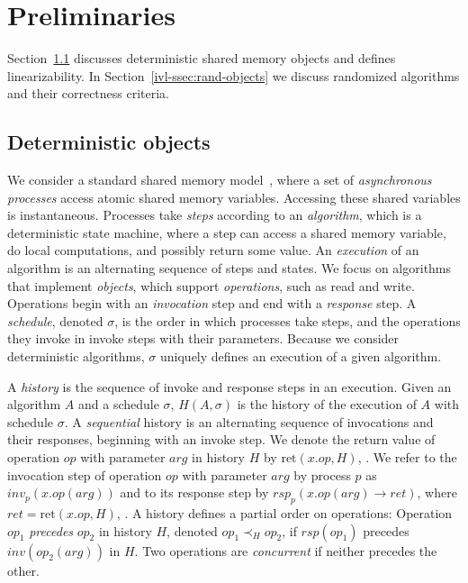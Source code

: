 \section{Preliminaries}
\label{ivl-sec:preliminaries}

Section~\ref{ivl-ssec:det-objects} discusses deterministic shared memory objects and defines linearizability.
In Section~\ref{ivl-ssec:rand-objects} we discuss randomized algorithms and their correctness criteria.

\subsection{Deterministic objects}
\label{ivl-ssec:det-objects}

We consider a standard shared memory model~\cite{herlihy1990linearizability}, where a set of \emph{asynchronous}
\emph{processes} access atomic shared memory variables. Accessing these
shared variables is instantaneous.
Processes take \emph{steps} according to an \emph{algorithm}, which is a deterministic
state machine, where a step can access a shared memory variable, do local computations, and possibly return
some value. 
 An \emph{execution} of an algorithm is an alternating
sequence of steps and states. We focus on algorithms that
implement \emph{objects}, which support
\emph{operations}, such as {\sc read} and {\sc write}. Operations begin
with an \emph{invocation} step and end with a \emph{response} step.
A \emph{schedule}, denoted $\sigma$, is the order in
which processes take steps, and the operations they invoke
in invoke steps with their parameters.
Because we consider deterministic algorithms,
$\sigma$ uniquely defines an execution of a given algorithm.

A \emph{history} is the sequence of invoke and response steps in an execution. Given an algorithm $A$ and
a schedule $\sigma$, $H(A, \sigma)$ is the history of the execution of $A$ with
schedule $\sigma$. A \emph{sequential} history is an alternating sequence of
invocations and their responses, beginning with an invoke step.
We denote the return value of operation $op$ with parameter $arg$ in history $H$ by $\text{ret}(x.op,H)$,
.
We refer to the invocation step of operation $op$ with parameter $arg$
by process $p$ as $inv_p(x.op(arg))$ and to its response
step by $rsp_p(x.op(arg)\rightarrow ret)$, where $ret = \text{ret}(x.op,H)$, .  A history
defines a partial order on operations: Operation $op_1$ \emph{precedes} $op_2$
in history $H$, denoted $op_1 \prec_H op_2$, if $rsp(op_1)$ precedes $inv(op_2(arg))$
in $H$. Two operations are \emph{concurrent} if neither precedes the other.

